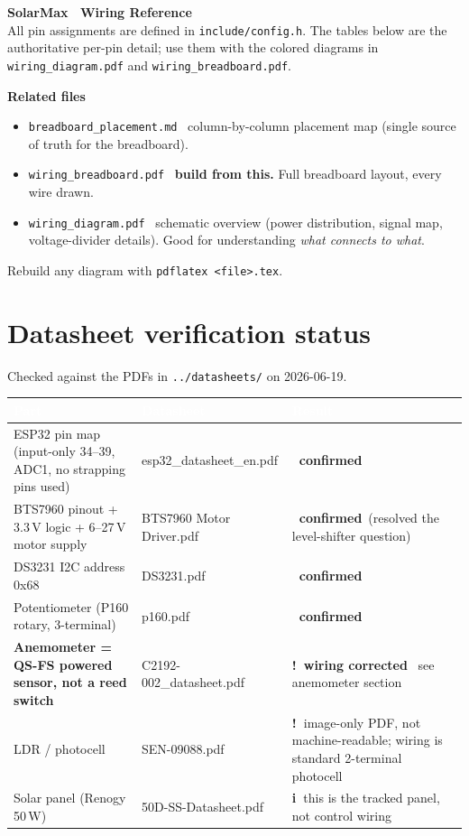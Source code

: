 \documentclass[11pt]{article}
\newcommand{\yes}{\textcolor{okgreen}{\textbf{\checkmark\ confirmed}}}
\newcommand{\caution}{\textcolor{warnorange}{\textbf{!\ }}}
\newcommand{\info}{\textcolor{infoblue}{\textbf{i\ }}}
\newcommand{\tc}[1]{\textcolor{white}{\textbf{#1}}}   %
\newcommand{\nd}{\textrm{\textemdash}}                %
\begin{document}
\begin{center}
  {\LARGE\bfseries SolarMax \nd\ Wiring Reference}\\[4pt]
  {\small All pin assignments are defined in \texttt{include/config.h}.
   The tables below are the authoritative per-pin detail; use them with the
   colored diagrams in \texttt{wiring\_diagram.pdf} and
   \texttt{wiring\_breadboard.pdf}.}
\end{center}
\vspace{4pt}

\begin{notebox}
\textbf{Related files}
\begin{itemize}
  \item \texttt{breadboard\_placement.md} \nd\ column-by-column placement map
        (single source of truth for the breadboard).
  \item \texttt{wiring\_breadboard.pdf} \nd\ \textbf{build from this.} Full
        breadboard layout, every wire drawn.
  \item \texttt{wiring\_diagram.pdf} \nd\ schematic overview (power distribution,
        signal map, voltage-divider details). Good for understanding
        \emph{what connects to what}.
\end{itemize}
Rebuild any diagram with \texttt{pdflatex <file>.tex}.
\end{notebox}

\section*{Datasheet verification status}
Checked against the PDFs in \texttt{../datasheets/} on 2026-06-19.

\smallskip
{}
\begin{xltabular}{\textwidth}{@{}L T{3.2cm} L@{}}
\toprule
{}\tc{Part} & \tc{Datasheet} & \tc{Result}\\
\midrule\endhead
ESP32 pin map (input-only 34--39, ADC1, no strapping pins used)
  & esp32_datasheet_en.pdf & \yes\\
BTS7960 pinout + 3.3\,V logic + 6--27\,V motor supply
  & BTS7960 Motor Driver.pdf & \yes\ (resolved the level-shifter question)\\
DS3231 I2C address 0x68 & DS3231.pdf & \yes\\
Potentiometer (P160 rotary, 3-terminal) & p160.pdf & \yes\\
\textbf{Anemometer = QS-FS powered sensor, not a reed switch}
  & C2192-002_datasheet.pdf
  & \caution\textbf{wiring corrected} \nd\ see anemometer section\\
LDR / photocell & SEN-09088.pdf
  & \caution image-only PDF, not machine-readable; wiring is standard
    2-terminal photocell\\
Solar panel (Renogy 50\,W) & 50D-SS-Datasheet.pdf
  & \info this is the tracked panel, not control wiring\\
\bottomrule
\end{xltabular}
\end{document}

